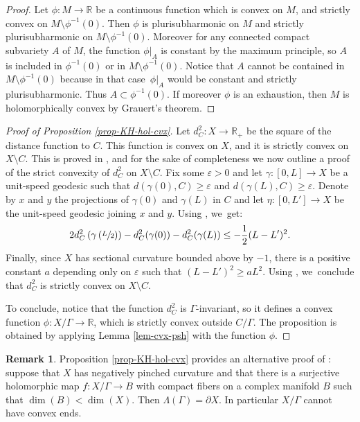 \documentclass[JEP,XML,SOM,Unicode,NoEqCountersInSection,published]{cedram}
\let\epsilon\varepsilon
\theoremstyle{definition}
\newtheorem*{remark}{Remark}
\newcommand{\R}{\mathbb{R}}
\begin{document}
\begin{proof}
Let $\phi:M\to \R$ be a continuous function which is convex on $M$, and strictly convex on $M\setminus \phi^{-1}(0)$. Then $\phi$ is plurisubharmonic on $M$ and strictly plurisubharmonic on $M\setminus \phi^{-1}(0)$. Moreover for any connected compact subvariety $A$ of $M$, the function $\phi\vert_{A}$ is constant by the maximum principle, so $A$ is included in $\phi^{-1}(0)$ or in $M\setminus \phi^{-1}(0)$. Notice that $A$ cannot be contained in $M\setminus \phi^{-1}(0)$ because in that case~$\phi\vert_{A}$ would be constant and strictly plurisubharmonic. Thus $A\subset \phi^{-1}(0)$. If moreover $\phi$ is an exhaustion, then $M$ is holomorphically convex by Grauert's theorem.
\end{proof}

\begin{proof}[Proof of Proposition \ref{prop-KH-hol-cvx}]
Let $d_C^{2}:X\to \R_+$ be the square of the distance function to $C$. This function is convex on $X$, and it is strictly convex on $X\setminus C$. This is proved in \cite[Lem.\,4.5]{benoistHarmonicQuasiisometricMaps2023}, and for the sake of completeness we now outline a proof of the strict convexity of $d_C^{2}$ on $X\setminus C$. Fix some $\epsilon>0$ and let $\gamma:[0,L]\to X$ be a unit-speed geodesic such that $d(\gamma(0),C)\ge \epsilon$ and $d(\gamma(L),C)\ge \epsilon$. Denote by $x$ and $y$ the projections of $\gamma(0)$ and $\gamma(L)$ in $C$ and let $\eta:[0,L']\to X$ be the unit-speed geodesic joining $x$ and $y$. Using \cite[Cor.\,2.1.3 - Form.\,2.1(iv)]{korevaarSobolevSpacesHarmonic1993}, we~get:
\begin{equation*}
2d_C^{2}\left(\gamma\left(\sfrac{L}{2}\right)\right) - d_C^{2}(\gamma(0)) - d_C^{2}(\gamma(L)) \le -\frac{1}{2}(L-L')^{2}.
\end{equation*}
Finally, since $X$ has sectional curvature bounded above by $-1$, there is a positive constant $a$ depending only on $\epsilon$ such that $(L-L')^{2}\ge aL^{2}$. Using \cite[Lem.\,1]{greeneConvexFunctionsManifolds1976manuel}, we~conclude that $d_C^{2}$ is strictly convex on $X\setminus C$.

To conclude, notice that the function $d_C^{2}$ is $\Gamma$\nobreakdash-invariant, so it defines a convex function $\phi:X/\Gamma\to \R$, which is strictly convex outside $C/\Gamma$. The proposition is obtained by applying Lemma \ref{lem-cvx-psh} with the function $\phi$.
\end{proof}

\begin{remark}
Proposition \ref{prop-KH-hol-cvx} provides an alternative proof of \cite[Prop.\,5]{kapovichSurveyComplexHyperbolic2022}: suppose that $X$ has negatively pinched curvature and that there is a surjective holomorphic map $f:X/\Gamma \to B$ with compact fibers on a complex manifold $B$ such that \hbox{$\dim(B)<\dim(X)$}. Then $\Lambda(\Gamma)=\partial X$. In particular $X/\Gamma$ cannot have convex ends.
\end{remark}
\end{document}
